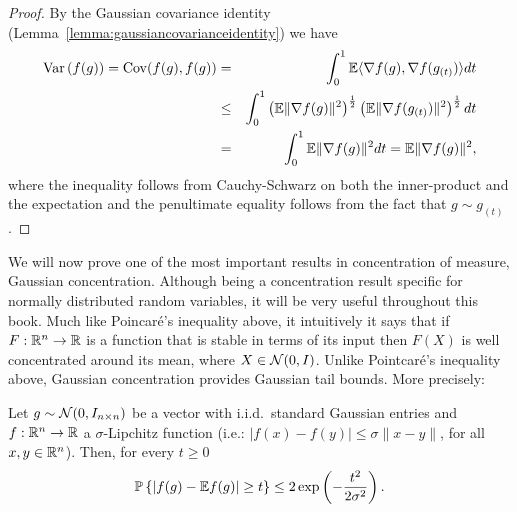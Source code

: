 \begin{proof}
By the Gaussian covariance identity (Lemma~\ref{lemma:gaussiancovarianceidentity}) we have
\begin{eqnarray*}
\operatorname{Var}\left( f(g) \right) = \operatorname{Cov}(f(g),f(g)) &=& \int_{0}^1 \mathbb{E} \langle \nabla f(g),\nabla f(g_{(t)}) \rangle dt \\
& \leq  & \int_{0}^1 \left(\mathbb{E}\|\nabla f(g)\|^2\right)^{\frac12}\left(\mathbb{E}\|\nabla f(g_{(t)})\|^2\right)^{\frac12}  dt \\
& = & \int_{0}^1 \mathbb{E}\|\nabla f(g)\|^2dt = \mathbb{E}\|\nabla f(g)\|^2, 
\end{eqnarray*}
where the inequality follows from Cauchy-Schwarz on both the inner-product and the expectation and the penultimate equality follows from the fact that $g\sim g_{(t)}$.
\end{proof}

We will now prove one of the most important results in concentration of measure, Gaussian concentration. Although being a concentration result specific for normally distributed random variables, it will be very useful throughout this book. Much like Poincar\'{e}'s inequality above, it intuitively it says that if $F:\mathbb{R}^n\to\mathbb{R}$ is a function that is stable in terms of its input then $F(X)$ is well concentrated around its mean, where $X\in\mathcal{N}(0,I)$. Unlike Pointcar\'{e}'s inequality above, Gaussian concentration provides Gaussian tail bounds. More precisely:

\begin{theorem}\label{theorem:4:gaussianconcentration}
 Let $g\sim\mathcal{N}(0,I_{n\times n})$ be a vector with i.i.d.\ standard Gaussian entries and $f:\mathbb{R}^n\to\mathbb{R}$ a $\sigma$-Lipchitz function (i.e.: $|f(x)-f(y)|\leq \sigma \|x-y\|$, for all $x,y\in\mathbb{R}^n$). Then, for every $t\geq 0$
 \[
  {\mathbb{P}}\left\{ \left| f(g) - \mathbb{E} f(g)\right| \geq t   \right\} \leq 2 \exp\left( -\frac{t^2}{2\sigma^2} \right).
 \]
\end{theorem}



